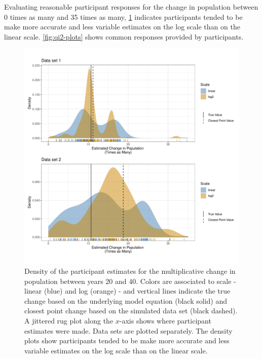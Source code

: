\documentclass[print]{nuthesis}
\begin{document}
Evaluating reasonable participant responses for the change in population between 0 times as many and 35 times as many, \cref{fig:qi2-density} indicates participants tended to be make more accurate and less variable estimates on the log scale than on the linear scale.
\cref{fig:qi2-plots} shows common responses provided by participants.

\begin{figure}[tbp]

{\centering \includegraphics[width=1\linewidth,]{thesis_files/figure-latex/qi2-density-1} 

}

\caption[Intermediate Q2 density]{Density of the participant estimates for the multiplicative change in population between years 20 and 40. Colors are associated to scale - linear (blue) and log (orange) - and vertical lines indicate the true change based on the underlying model equation (black solid) and closest point change based on the simulated data set (black dashed). A jittered rug plot along the $x$-axis shows where participant estimates were made. Data sets are plotted separately. The density plots show participants tended to be make more accurate and less variable estimates on the log scale than on the linear scale.}\label{fig:qi2-density}
\end{figure}
\end{document}
